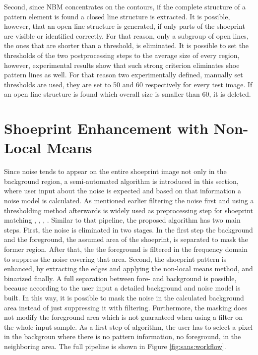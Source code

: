 \documentclass[draft,final]{vutinfth} %
\begin{document}
Second, since NBM concentrates on the contours, if the complete structure of a pattern element is found a closed line structure is extracted.
It is possible, however, that an open line structure is generated,  if only parts of the shoeprint are visible or identified correctly.
For that reason, only a subgroup of open lines, the ones that are shorter than a threshold, is eliminated.
It is possible to set the thresholds of the two postprocessing steps to the average size of every region, however, experimental results show that such strong criterion eliminates shoe pattern lines as well.
For that reason two experimentally defined, manually set thresholds are used, they are set to 50 and 60 respectively for every test image.
If an open line structure is found which overall size is smaller than 60, it is deleted.

\section{Shoeprint Enhancement with Non-Local Means}
\par
Since noise tends to appear on the entire shoeprint image not only in the background region, a semi-automated algorithm is introduced in this section, where user input about the noise is expected and based on that information a noise model is calculated.
As mentioned earlier filtering the noise first and using a thresholding method afterwards is widely used as preprocessing step for shoeprint matching \cite{alizadeh2017automatic}, \cite{wang2014automatic}, \cite{li2014retrieval}, \cite{kong2014novel}.
Similar to that pipeline, the proposed algorithm has two main steps.
First, the noise is eliminated in two stages.
In the first step the background and the foreground, the assumed area of the shoeprint, is separated to mask the former region.
After that, the the foreground is filtered in the frequency domain to suppress  the noise covering that area.
Second, the shoeprint pattern is enhanced, by extracting the edges and applying the non-local means method, and binarized finally.
A full separation between fore- and background is possible, because according to the user input a detailed background and noise model is built.
In this way, it is possible to mask the noise in the calculated background area instead of just suppressing it with filtering.
Furthermore, the masking does not modify the foreground area which is not guaranteed when using a filter on the whole input sample.
As a first step of algorithm, the user has to select a pixel in the backgroun where there is no pattern information, no foreground, in the neighboring area.
The full pipeline is shown in Figure \ref{fig:sans:workflow}.
\end{document}
